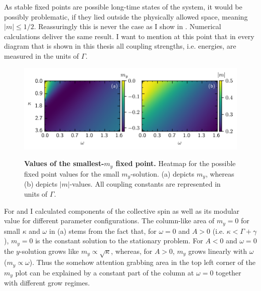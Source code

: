 As stable fixed points are possible long-time states of the system, it would be possibly problematic, if they lied outside the physically allowed space, meaning $|m|\leq1/2$. Reassuringly this is never the case as I show in . Numerical calculations deliver the same result. I want to mention at this point that in every diagram that is shown in this thesis all coupling strengths, i.e. energies, are measured in the units of $\Gamma$.
%     
\begin{figure}[H]
    \caption{\textbf{Values of the smallest-$m_y$ fixed point.} Heatmap for the possible fixed point values for the small $m_y$-solution. (a) depicts $m_y$, whereas (b) depicts $|m|$-values. All coupling constants are represented in units of $\Gamma$.}
    \includegraphics{pictures/fixp_bound_heatmap_s_horiz.png}
    \label{fig:fixp_small_bound_hm}
\end{figure}
For  and  I calculated components of the collective spin as well as its modular value for different parameter configurations.
The column-like area of $m_y=0$ for small $\kappa$ and $\omega$ in (a) stems from the fact that, for $\omega=0$ and $A>0$ (i.e. $\kappa<\Gamma+\gamma$), $m_y=0$ is the constant solution to the stationary problem. For $A<0$ and $\omega=0$ the $y$-solution grows like $m_y\propto\sqrt{\kappa}$, whereas, for $A>0$, $m_y$ grows linearly with $\omega$ ($m_y\propto\omega$). Thus the somehow attention grabbing area in the top left corner of the $m_y$ plot can be explained by a constant part of the column at $\omega=0$ together with different grow regimes.

